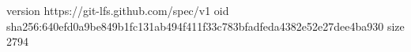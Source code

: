 version https://git-lfs.github.com/spec/v1
oid sha256:640efd0a9be849b1fc131ab494f411f33c783bfadfeda4382e52e27dee4ba930
size 2794
